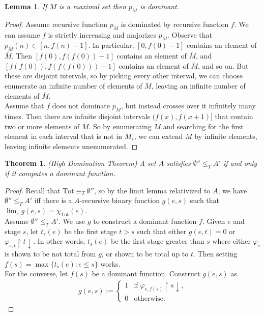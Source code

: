 \documentclass{article}
\newtheorem{lemma}{Lemma}[subsection]
\newtheorem{theorem}{Theorem}[subsection]
\begin{document}
  \begin{lemma}
    If $M$ is a maximal set then $p_{\overline{M}}$ is dominant.
    \label{lemma:high-maximal}
  \end{lemma}
  \begin{proof}
    Assume recursive function $p_{\overline{M}}$ is dominated by recursive
    function $f$. We can assume $f$ is strictly increasing and majorizes
    $p_{\overline{M}}$. Observe that
    $p_{\overline{M}}(n)\in[n,f(n)-1]$. In particular, $[0,f(0)-1]$
    contains an element of $\overline{M}$. Then $[f(0),f(f(0))-1]$ contains
    an element of $\overline{M}$, and $[f(f(0)),f(f(f(0)))-1]$ contains an
    element of $\overline{M}$, and so on. But these are disjoint intervals,
    so by picking every other interval, we can choose enumerate an infinite
    number of elements of $\overline{M}$, leaving an infinite number of
    elements of $\overline{M}$. \\

    Assume that $f$ does not dominate $p_{\overline{M}}$, but instead
    crosses over it infinitely many times. Then there are infinite disjoint
    intervals $(f(x),f(x+1)]$ that contain two or more elements of
    $\overline{M}$. So by enumerating $M$ and searching for the first
    element in each interval that is not in $M_s$, we can extend $M$ by
    infinite elements, leaving infinite elements unenumerated.
  \end{proof}

  \begin{theorem}
    \textit{(High Domination Theorem)} A set $A$ satisfies
    $\emptyset''\leq_T A'$ if and only if it computes a dominant function.
    \label{thm:high-domination}
  \end{theorem}
  \begin{proof}
    Recall that $\text{Tot}\equiv_T \emptyset''$, so by the limit lemma
    relativized to $A$, we have $\emptyset''\leq_T A'$ iff there is a
    $A$-recursive binary function $g(e,s)$ such that $\lim_s g(e,s)
    =\chi_{\text{Tot}}(e)$. \\

    Assume $\emptyset''\leq_T A'$. We use $g$ to construct a dominant
    function $f$. Given $e$ and stage $s$, let $t_s(e)$ be the first stage
    $t>s$ such that either $g(e,t)=0$ or $\varphi_{e,t}\restriction
    t\downarrow$. In other words, $t_s(e)$ be the first stage greater than
    $s$ where either $\varphi_e$ is shown to be not total from $g$, or
    shown to be total up to $t$. Then setting $f(s)=\max\{t_s(e):e\leq s\}$
    works. \\

    For the converse, let $f(s)$ be a dominant function. Construct $g(e,s)$
    as
    \begin{align*}
      g(e,s) :=
      \begin{cases}
        1 &\text{if}\; \varphi_{e,f(s)}\restriction s\downarrow,\\
        0 &\text{otherwise}.
      \end{cases}
    \end{align*}
  \end{proof}
\end{document}
